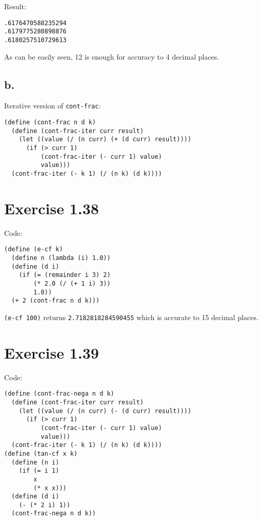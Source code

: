 \documentclass[../main.tex]{subfiles}
\begin{document}
Result:

\begin{lstlisting}
.6176470588235294
.6179775280898876
.6180257510729613
\end{lstlisting}

As can be easily seen, 12 is enough for accuracy to 4 decimal places.

\subsection*{b.}

Iterative version of \lstinline{cont-frac}:

\begin{lstlisting}
(define (cont-frac n d k)
  (define (cont-frac-iter curr result)
    (let ((value (/ (n curr) (+ (d curr) result))))
      (if (> curr 1)
          (cont-frac-iter (- curr 1) value)
          value)))
  (cont-frac-iter (- k 1) (/ (n k) (d k))))
\end{lstlisting}

\section{Exercise 1.38}

Code:

\begin{lstlisting}
(define (e-cf k)
  (define n (lambda (i) 1.0))
  (define (d i)
    (if (= (remainder i 3) 2)
        (* 2.0 (/ (+ 1 i) 3))
        1.0))
  (+ 2 (cont-frac n d k)))
\end{lstlisting}

\lstinline{(e-cf 100)} returns \lstinline{2.7182818284590455} which is
 accurate to 15 decimal places.

\section{Exercise 1.39}

Code:

\begin{lstlisting}
(define (cont-frac-nega n d k)
  (define (cont-frac-iter curr result)
    (let ((value (/ (n curr) (- (d curr) result))))
      (if (> curr 1)
          (cont-frac-iter (- curr 1) value)
          value)))
  (cont-frac-iter (- k 1) (/ (n k) (d k))))
(define (tan-cf x k)
  (define (n i)
    (if (= i 1)
        x
        (* x x)))
  (define (d i)
    (- (* 2 i) 1))
  (cont-frac-nega n d k))
\end{lstlisting}
\end{document}
